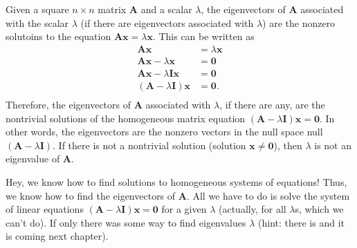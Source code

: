 \documentclass[
]{book}
\theoremstyle{definition}
\theoremstyle{definition}
\theoremstyle{definition}
\theoremstyle{remark}
\begin{document}
Given a square \(n \times n\) matrix \(\mathbf{A}\) and a scalar \(\lambda\), the eigenvectors of \(\mathbf{A}\) associated with the scalar \(\lambda\) (if there are eigenvectors associated with \(\lambda\)) are the nonzero solutoins to the equation \(\mathbf{A} \mathbf{x} = \lambda \mathbf{x}\). This can be written as
\[
\begin{aligned}
\mathbf{A} \mathbf{x} & = \lambda \mathbf{x} \\
\mathbf{A} \mathbf{x} -\lambda \mathbf{x} & = \mathbf{0} \\
\mathbf{A} \mathbf{x} -\lambda \mathbf{I} \mathbf{x} & = \mathbf{0} \\
\left( \mathbf{A} -\lambda \mathbf{I} \right) \mathbf{x} & = \mathbf{0}. \\
\end{aligned}
\]
Therefore, the eigenvectors of \(\mathbf{A}\) associated with \(\lambda\), if there are any, are the nontrivial solutions of the homogeneous matrix equation \(\left( \mathbf{A} - \lambda \mathbf{I} \right) \mathbf{x} = \mathbf{0}\). In other words, the eigenvectors are the nonzero vectors in the null space null\(\left( \mathbf{A} -\lambda \mathbf{I} \right)\). If there is not a nontrivial solution (solution \(\mathbf{x} \neq \mathbf{0}\)), then \(\lambda\) is not an eigenvalue of \(\mathbf{A}\).

Hey, we know how to find solutions to homogeneous systems of equations! Thus, we know how to find the eigenvectors of \(\mathbf{A}\). All we have to do is solve the system of linear equations \(\left( \mathbf{A} -\lambda \mathbf{I} \right) \mathbf{x} = \mathbf{0}\) for a given \(\lambda\) (actually, for all \(\lambda\)s, which we can't do). If only there was some way to find eigenvalues \(\lambda\) (hint: there is and it is coming next chapter).
\end{document}
